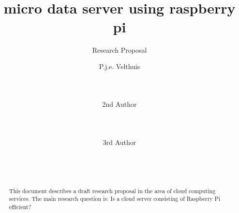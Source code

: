 \documentclass{sig-alternate-br}
\begin{document}
%

\title{micro data server using raspberry pi}
 \subtitle{Research Proposal}




\author{ 
%
%
\alignauthor P.j.e. Velthuis\\
       \\
       \\
       \\
\alignauthor 2nd Author\\
       \\
       \\
       \\
\alignauthor 3rd Author\\
       \\
       \\
       \\
}



\maketitle
\begin{abstract}
This document describes a draft research proposal in the
area of cloud computing services. The main research question
is: Is a cloud server consisting of Raspberry Pi efficient?
\end{abstract}
\end{document}
